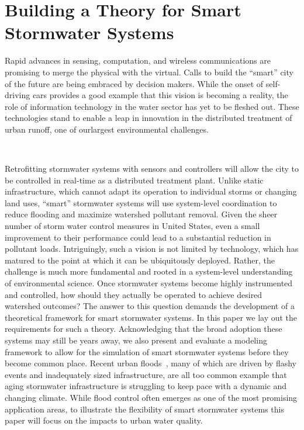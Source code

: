\chapter{Building a Theory for Smart Stormwater Systems}\label{ch:theory}
Rapid advances in sensing, computation, and wireless communications are promising to merge the physical with the virtual.
Calls to build the ``smart'' city of the future are being embraced by decision makers.
While the onset of self-driving cars provides a good example that this vision is becoming a reality, the role  of information technology in the water sector has yet to be fleshed out.
These technologies stand to enable a leap in innovation in the distributed treatment of urban runoff, one of ourlargest environmental challenges. 

\

Retrofitting stormwater systems with sensors and controllers will allow the city to be controlled in real-time as a distributed treatment plant.
Unlike static infrastructure, which cannot adapt its operation to individual storms or changing land uses, ``smart'' stormwater systems will use system-level coordination to reduce flooding and maximize watershed pollutant removal. Given the sheer number of storm water control measures in United States, even a small improvement to their performance could lead to a substantial reduction in pollutant loads.
Intriguingly, such a vision is not limited by technology, which has matured to the point at which it can be ubiquitously deployed. 
Rather, the challenge is much more fundamental and rooted in a system-level understanding of environmental science.
Once stormwater systems become highly instrumented and controlled, how should they actually be operated to achieve desired watershed outcomes?
The answer to this question demands the development of a theoretical framework for smart stormwater systems. 
In this paper we lay out the requirements for such a theory.
Acknowledging that the broad adoption these systems may still be years away,  we also present and evaluate a modeling framework to allow for the simulation of smart stormwater systems before they become common place. 
Recent urban floods~\cite{Frosch2016}, many of which are driven by flashy events and inadequately sized infrastructure, are all too common example that aging stormwater infrastructure is struggling to keep pace with a dynamic and changing climate. 
While flood control often emerges as one of the most promising application areas, to illustrate the flexibility of smart stormwater systems this paper will focus on the impacts to urban water quality.


